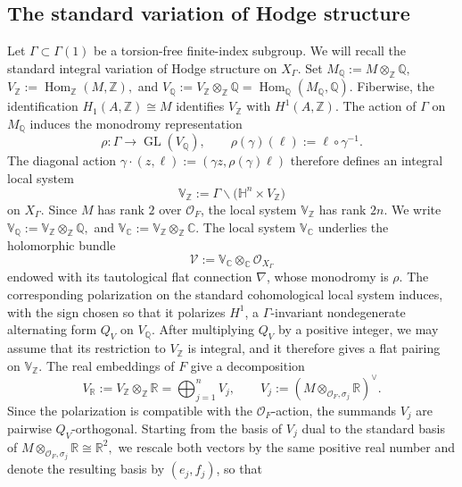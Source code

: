 \documentclass[12 pt]{amsart}
\theoremstyle{definition}
\newcommand{\Q}{\mathbb{Q}} %
\begin{document}
\subsection{The standard variation of Hodge structure}Let $\Gamma\subset\Gamma(1)$ be a torsion-free finite-index subgroup. We will recall the standard integral variation of Hodge structure on $X_{\Gamma}.$
Set
\(
M_{\mathbb Q}:=M\otimes_{\mathbb Z}\mathbb Q,
\)
\(
V_{\mathbb Z}:=\operatorname{Hom}_{\mathbb Z}(M,\mathbb Z),
\)
and
\(
V_{\mathbb Q}:=V_{\mathbb Z}\otimes_{\mathbb Z}\mathbb Q
=\operatorname{Hom}_{\mathbb Q}(M_{\mathbb Q},\mathbb Q).
\)
Fiberwise, the identification $H_1(A,\mathbb Z)\cong M$ identifies $V_{\mathbb Z}$ with $H^1(A,\mathbb Z)$. The action of $\Gamma$ on $M_{\Q}$ induces the monodromy representation
\[
\rho:\Gamma\longrightarrow\operatorname{GL}(V_{\mathbb Q}),\qquad
\rho(\gamma)(\ell):=\ell\circ\gamma^{-1}.
\]
The diagonal action
\(
\gamma\cdot(z,\ell):=(\gamma z,\rho(\gamma)\ell)
\)
therefore defines an integral local system
\[
\mathbb V_{\mathbb Z}:=\Gamma\backslash
\bigl(\mathbb H^n\times V_{\mathbb Z}\bigr)
\]
on $X_\Gamma$. Since $M$ has rank $2$ over $\mathcal O_F$, the local system $\mathbb V_{\mathbb Z}$ has rank $2n$. We write
\(
\mathbb V_{\mathbb Q}:=\mathbb V_{\mathbb Z}\otimes_{\mathbb Z}\mathbb Q,
\) and 
\(
\mathbb V_{\mathbb C}:=\mathbb V_{\mathbb Z}\otimes_{\mathbb Z}\mathbb C.
\)
The local system \(\mathbb V_{\mathbb C}\) underlies the holomorphic
bundle
\[
\mathcal V:=\mathbb V_{\mathbb C}\otimes_{\mathbb C}
\mathcal O_{X_\Gamma}
\]
endowed with its tautological flat connection \(\nabla\), whose
monodromy is \(\rho\).
The corresponding polarization on the standard cohomological local system induces, with the sign chosen so that it polarizes $H^1$, a $\Gamma$-invariant nondegenerate alternating form $Q_V$ on $V_{\mathbb Q}$. After multiplying $Q_V$ by a positive integer, we may assume that its restriction to $V_{\mathbb Z}$ is integral, and it therefore gives a flat pairing on $\mathbb V_{\mathbb Z}$. The real embeddings of $F$ give a decomposition
\[
V_{\mathbb R}:=V_{\mathbb Z}\otimes_{\mathbb Z}\mathbb R
=\bigoplus_{j=1}^nV_j,\qquad
V_j:=\left(M\otimes_{\mathcal O_F,\sigma_j}\mathbb R\right)^\vee.
\]
Since the polarization is compatible with the $\mathcal O_F$-action, the summands $V_j$ are pairwise $Q_V$-orthogonal. Starting from the basis of $V_j$ dual to the standard basis of
\(
M\otimes_{\mathcal O_F,\sigma_j}\mathbb R\cong\mathbb R^2,
\)
we rescale both vectors by the same positive real number and denote the resulting basis by $(e_j,f_j)$, so that
\end{document}
